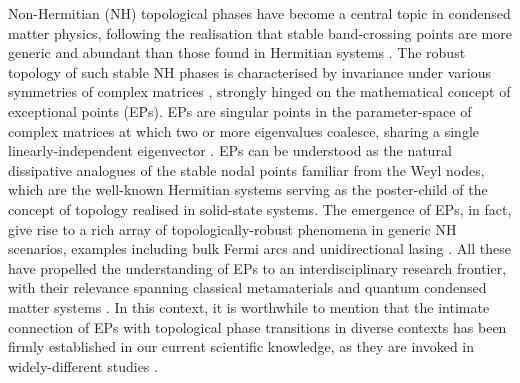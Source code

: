 \documentclass[aps, prb, onecolumn, nofootinbib, citeautoscript, 10pt]{revtex4-2}
\begin{document}
Non-Hermitian (NH) topological phases have become a central topic in condensed matter physics, following the realisation that stable band-crossing points are more generic and abundant than those found in Hermitian systems \cite{emil_nh_nodal,yoshida-peters, emil_review,ips-emil,prl_eps}.
The robust topology of such stable NH phases \cite{emil_review} is characterised by invariance under various symmetries of complex matrices \cite{bernard, ips-emil}, strongly hinged on the mathematical concept of exceptional points (EPs). EPs are singular points in the parameter-space of complex matrices at which two or more eigenvalues coalesce, sharing a single linearly-independent eigenvector \cite{BerryDeg, Heiss, PhysRevX.6.021007, EPreview, ozdemir2019parity}. EPs can be understood as the natural dissipative analogues of the stable nodal points \cite{BerryDeg, Heiss} familiar from the Weyl nodes, which are the well-known Hermitian systems serving as the poster-child of the concept of topology realised in solid-state systems. The emergence of EPs, in fact, give rise to a rich array of topologically-robust phenomena in generic NH scenarios, examples including bulk Fermi arcs \cite{NHarc} and unidirectional lasing \cite{lasing}. All these have propelled the understanding of EPs to an interdisciplinary research frontier, with their relevance spanning classical metamaterials and quantum condensed matter systems \cite{EPreview}. In this context, it is worthwhile to mention that the intimate connection of EPs with topological phase transitions in diverse contexts has been firmly established in our current scientific knowledge, as they are invoked in widely-different studies \cite{ips-ep-epl, ips-tewari, emil_review, kang-emil, ips-emil, prl_eps,  ips-kang, ips-bp, ips-yao-lee}.
\end{document}
